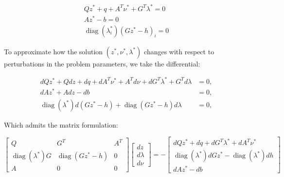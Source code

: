 \documentclass{article}
\DeclareMathOperator{\diag}{diag}
\begin{document}
\begin{equation}
    \begin{aligned}
        Qz^* + q + A^T\nu^* + G^T\lambda^* = 0 \\
        Az^* - b = 0\\
        \diag({\lambda_i^*})(Gz^* - h)_i = 0
    \end{aligned}
\end{equation}

To approximate how the solution $(z^*, \nu^*, \lambda^*)$ changes with respect to perturbations in the problem parameters, we take the differential:


\begin{equation}
    \begin{aligned}
        dQ z^* + Q dz + dq + dA^T \nu^* + A^T d\nu + dG^T \lambda^* + G^T d\lambda &= 0, \\
        dA z^* + A dz - db &= 0, \\
        \diag(\lambda^*) d(Gz^* - h) + \diag(Gz^* - h) d\lambda &= 0,
    \end{aligned}
\end{equation}

Which admits the matrix formulation:

\begin{equation}
    \begin{bmatrix}
        Q & G^T & A^T \\
        \diag(\lambda^*) G & \diag(Gz^* - h) & 0 \\
        A & 0 & 0
    \end{bmatrix}
    \begin{bmatrix}
        dz \\
        d\lambda \\
        d\nu
    \end{bmatrix}
    =
    -\begin{bmatrix}
        dQ z^* + dq + dG^T \lambda^* + dA^T \nu^* \\
        \diag(\lambda^*) dG z^* - \diag(\lambda^*) dh \\
        dA z^* - db
    \end{bmatrix}
\end{equation}
\end{document}
